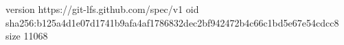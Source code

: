 version https://git-lfs.github.com/spec/v1
oid sha256:b125a4d1e07d1741b9afa4af1786832dec2bf942472b4c66c1bd5e67e54cdcc8
size 11068
